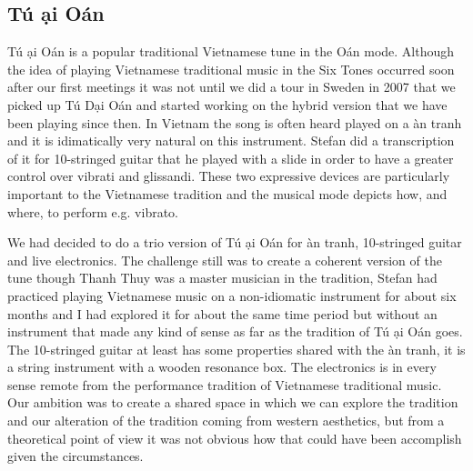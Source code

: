 \documentclass[a4paper]{article}
\begin{document}

\subsection{T\'{u} \DH \d{a}i O\'{a}n}
\label{sec:tu-ddai-oan}

T\'{u} \DH \d{a}i O\'{a}n is a popular traditional Vietnamese tune in the O\'{a}n mode. Although the idea of playing Vietnamese traditional music in the Six Tones occurred soon after our first meetings it was not until we did a tour in Sweden in 2007 that we picked up T\'{u} D\d{a}i O\'{a}n and started working on the hybrid version that we have been playing since then. In Vietnam the song is often heard played on a \DH \`{a}n tranh and it is idimatically very natural on this instrument. Stefan did a transcription of it for 10-stringed guitar that he played with a slide in order to have a greater control over vibrati and glissandi. These two expressive devices are particularly important to the Vietnamese tradition and the musical mode depicts how, and where, to perform e.g. vibrato.

We had decided to do a trio version of T\'{u} \DH \d{a}i O\'{a}n for \DH \`{a}n tranh, 10-stringed guitar and live electronics. The challenge still was to create a coherent version of the tune though Thanh Thuy was a master musician in the tradition, Stefan had practiced playing Vietnamese music on a non-idiomatic instrument for about six months and I had explored it for about the same time period but without an instrument that made any kind of sense as far as the tradition of  T\'{u} \DH \d{a}i O\'{a}n goes. The 10-stringed guitar at least has some properties shared with the \DH \`{a}n tranh, it is a string instrument with a wooden resonance box. The electronics is in every sense remote from the performance tradition of Vietnamese traditional music. Our ambition was to create a shared space in which we can explore the tradition and our alteration of the tradition coming from western aesthetics, but from a theoretical point of view it was not obvious how that could have been accomplish given the circumstances.
\end{document}

